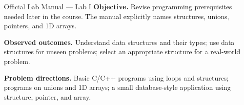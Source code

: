 
\begin{sourcealignment}{Official Lab Manual --- Lab I}
\textbf{Objective.} Revise programming prerequisites needed later in the course. The manual explicitly names structures, unions, pointers, and 1D arrays.

\textbf{Observed outcomes.} Understand data structures and their types; use data structures for unseen problems; select an appropriate structure for a real-world problem.

\textbf{Problem directions.} Basic C/C++ programs using loops and structures; programs on unions and 1D arrays; a small database-style application using structure, pointer, and array.
\end{sourcealignment}

